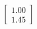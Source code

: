 \documentclass[preview]{standalone}
\begin{document}
\begin{align*}
\begin{bmatrix} 1.00 \\ 1.45 \end{bmatrix}
\end{align*}
\end{document}
